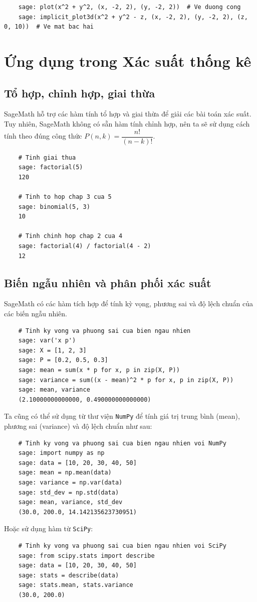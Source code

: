 \begin{lstlisting}
	sage: plot(x^2 + y^2, (x, -2, 2), (y, -2, 2))  # Ve duong cong
	sage: implicit_plot3d(x^2 + y^2 - z, (x, -2, 2), (y, -2, 2), (z, 0, 10))  # Ve mat bac hai
\end{lstlisting}

\section{Ứng dụng trong Xác suất thống kê}

\subsection{Tổ hợp, chỉnh hợp, giai thừa}
SageMath hỗ trợ các hàm tính tổ hợp và giai thừa để giải các bài toán xác suất. Tuy nhiên, SageMath không có sẵn hàm tính chỉnh hợp, nên ta sẽ sử dụng cách tính theo đúng công thức $P(n,k)=\dfrac{n!}{(n-k)!}$.

\begin{lstlisting}
	# Tinh giai thua
	sage: factorial(5)
	120
	
	# Tinh to hop chap 3 cua 5
	sage: binomial(5, 3)
	10
	
	# Tinh chinh hop chap 2 cua 4
	sage: factorial(4) / factorial(4 - 2)
	12
\end{lstlisting}

\subsection{Biến ngẫu nhiên và phân phối xác suất}
SageMath có các hàm tích hợp để tính kỳ vọng, phương sai và độ lệch chuẩn của các biến ngẫu nhiên.

\begin{lstlisting}
	# Tinh ky vong va phuong sai cua bien ngau nhien
	sage: var('x p')
	sage: X = [1, 2, 3]
	sage: P = [0.2, 0.5, 0.3]
	sage: mean = sum(x * p for x, p in zip(X, P))
	sage: variance = sum((x - mean)^2 * p for x, p in zip(X, P))
	sage: mean, variance
	(2.10000000000000, 0.490000000000000)
\end{lstlisting}

Ta cũng có thể sử dụng từ thư viện \texttt{NumPy} để tính giá trị trung bình (mean), phương sai (variance) và độ lệch chuẩn như sau:
\begin{lstlisting}
	# Tinh ky vong va phuong sai cua bien ngau nhien voi NumPy
	sage: import numpy as np
	sage: data = [10, 20, 30, 40, 50]
	sage: mean = np.mean(data)
	sage: variance = np.var(data)
	sage: std_dev = np.std(data)
	sage: mean, variance, std_dev
	(30.0, 200.0, 14.142135623730951)
\end{lstlisting}
Hoặc sử dụng hàm từ \texttt{SciPy}:
\begin{lstlisting}
	# Tinh ky vong va phuong sai cua bien ngau nhien voi SciPy
	sage: from scipy.stats import describe
	sage: data = [10, 20, 30, 40, 50]
	sage: stats = describe(data)
	sage: stats.mean, stats.variance
	(30.0, 200.0)
\end{lstlisting}

